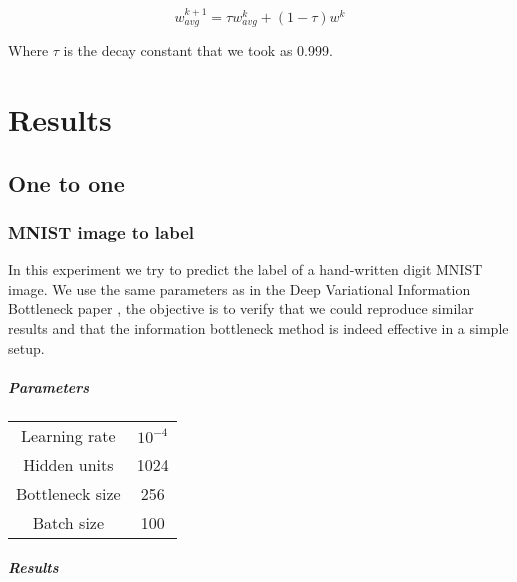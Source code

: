 \documentclass[10pt,oneside,openright]{report}
\begin{document}
$$w_{avg}^{k+1} = \tau w_{avg}^k  + (1 - \tau) w^k$$

Where $\tau$ is the decay constant that we took as 0.999.


\chapter{Results}
\section{One to one}
\subsection{MNIST image to label}

In this experiment we try to predict the label of a hand-written digit MNIST \cite{mnist} image.  We use the same parameters as in the Deep Variational Information Bottleneck paper \cite{vib}, the objective is to verify that we could reproduce similar results and that the information bottleneck method is indeed effective in a simple setup.

\paragraph{Parameters}

\begin{center}
\begin{tabular}{ c | c  }
 Learning rate & $10^{-4}$ \\
 Hidden units & 1024 \\
 Bottleneck size & 256 \\
 Batch size & 100
\end{tabular}
\end{center}

\paragraph{Results}
\end{document}
